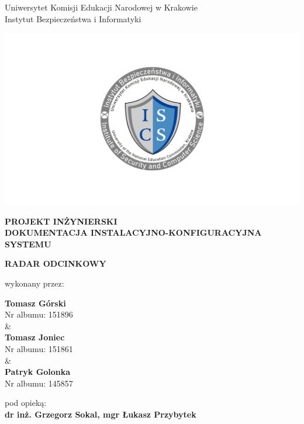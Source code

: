 \documentclass[12pt,a4paper,oneside]{article}
\theoremstyle{definition}
\numberwithin{equation}{section}
\begin{document}

\thispagestyle{empty}
\begin{titlepage}
\begin{center}\Large
Uniwersytet Komisji Edukacji Narodowej w Krakowie\\
\large
Instytut Bezpieczeństwa i Informatyki\\
\vskip 10pt
\end{center}
\begin{center}
\centering \includegraphics[width=1.0\columnwidth]{images/logo.png}
\end{center}

\begin{center}
 {\bf \fontsize{14pt}{14pt}\selectfont PROJEKT INŻYNIERSKI\\ DOKUMENTACJA INSTALACYJNO-KONFIGURACYJNA SYSTEMU}
\end{center}
\vskip 5pt
\begin{center}
 {\bf \fontsize{22pt}{22pt}\selectfont RADAR ODCINKOWY}
\end{center}

\begin{center}
 {\fontsize{12pt}{12pt}\selectfont wykonany przez: }
\end{center}
\begin{center}
 {\bf\fontsize{16pt}{16pt}\selectfont Tomasz Górski}\\
 {\fontsize{12pt}{12pt}\selectfont Nr albumu: 151896 \\\&\\}
 {\bf\fontsize{16pt}{16pt}\selectfont Tomasz Joniec}\\
 {\fontsize{12pt}{12pt}\selectfont Nr albumu: 151861\\\&\\}
 {\bf\fontsize{16pt}{16pt}\selectfont Patryk Golonka}\\
 {\fontsize{12pt}{12pt}\selectfont Nr albumu: 145857}
\end{center}
\begin{center}
 {\fontsize{12pt}{12pt}\selectfont pod opieką:}\\
 {\bf\fontsize{12pt}{12pt}\selectfont dr inż. Grzegorz Sokal, mgr Łukasz Przybytek}
\end{center}


\end{titlepage}
\end{document}
